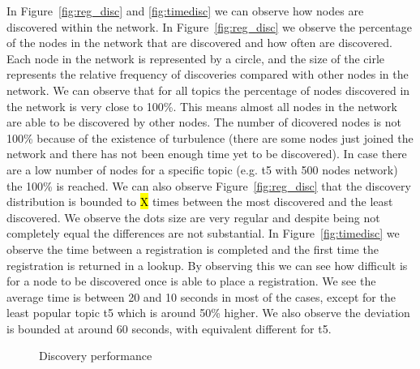 In Figure~\ref{fig:reg_disc} and \ref{fig:timedisc} we can observe how nodes are discovered within the network.
In Figure~\ref{fig:reg_disc} we observe the percentage of the nodes in the network that are discovered and how often are discovered.
Each node in the network is represented by a circle, and the size of the cirle represents the relative frequency of discoveries compared with other nodes in the network.
We can observe that for all topics the percentage of nodes discovered in the network is very close to 100\%. This means almost all nodes in the network are able to be discovered by other nodes. The number of dicovered nodes is not 100\% because of the existence of turbulence (there are some nodes just joined the network and there has not been enough time yet to be discovered). In case there are a low number of nodes for a specific topic (e.g. t5 with 500 nodes network) the 100\% is reached.
We can also observe Figure~\ref{fig:reg_disc} that the discovery distribution is bounded to \hl{X} times between the most discovered and the least discovered.
We observe the dots size are very regular and despite being not completely equal the differences are not substantial. 
In Figure~\ref{fig:timedisc} we observe the time between a registration is completed and the first time the registration
is returned in a lookup.
By observing this we can see how difficult is for a node to be discovered once is able to place a registration. 
We see the average time is between 20 and 10 seconds in most of the cases, except for the least popular topic t5 which is around 50\% higher. 
We also observe the deviation is bounded at around 60 seconds, with equivalent different for t5.


\begin{figure}[!h]
\centering
{} 
\hspace{-0.25cm}
 \caption{Discovery performance} 
\label{fig:discovery}
\vspace{-0.15in}
\end{figure}   


